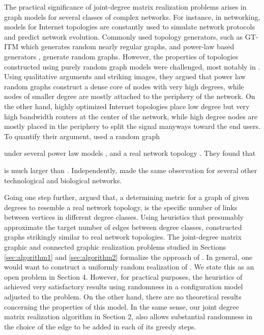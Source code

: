 \documentclass[12pt,a4paper]{article}
\theoremstyle{definition}
\theoremstyle{plain}
\begin{document}
The practical significance of joint-degree
matrix realization problems arises in graph
models for several classes of complex networks.
For instance, in networking, models for Internet
topologies are constantly used to simulate
network protocols and predict network evolution.
Commonly used topology generators, such as
GT-ITM \cite{Zegura2,Zegura3} which generates random nearly regular graphs,
and power-law based generators \cite{Faloutsos,ACL1,ACL2,Brite2,Inet,ALENEX03}, generate random graphs.
However, the properties of topologies constructed using
purely random graph models were challenged,
most notably in \cite{hot2,alderson}.
Using qualitative arguments and striking images,
they argued that 
power law random graphs construct a dense core
of nodes with very high degrees,
while nodes of smaller degree are mostly attached to the periphery of the
network. On the other hand, highly optimized Internet topologies
place low degree but very high bandwidth routers at the center of the network,
while high degree nodes are mostly placed in the periphery
to split the signal manyways toward the end users. 
To quantify their argument, \cite{alderson} used a random graph 

under several power law 
models \cite{nsbook2,nsbook3,chungbook2,newmanbook,durrettbook},
and a real network topology .
They found that
  
is much larger than
.
Independently, \cite{Newman1,Newman5} made the same observation
for several other technological and biological networks.

Going one step further, \cite{UCSDnet1,UCSDnet2}
argued that, 
a determining metric
for a graph of given degrees
to resemble a real network topology,
is the specific number of links
between vertices in different degree classes.
Using heuristics that presumably approximate
the target number of edges between degree classes, 
\cite{UCSDnet2} constructed graphs
strikingly similar to real network topologies. 
The joint-degree matrix graphic and connected graphic realization problems 
studied in Sections \ref{sec:algorithm1} and \ref{sec:algorithm2}
formalize the approach of \cite{UCSDnet1,UCSDnet2}. In general, one would want 
to construct a uniformly random realization of .
We state this as an open problem in Section 4. However, for practical purposes, 
the heuristics of \cite{UCSDnet1,UCSDnet2} achieved very satisfactory results 
using randomness in a configuration model adjusted to the  problem.
On the other hand, there are no theoretical results concerning the properties of this model.
In the same sense, our joint degree matrix realization algorithm in Section 2, also
allows substantial randomness in the choice of the edge to be added in each of its greedy steps.
\end{document}
